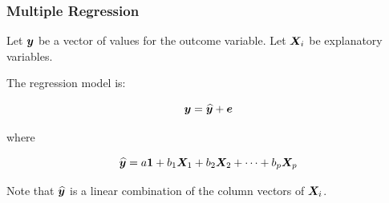 \documentclass{beamer}
\begin{document}
\begin{frame}
  \frametitle{Multiple Regression}

Let $\bm{y}$ be a vector of values for the outcome variable. Let $\bm{X}_i$ be explanatory variables.

\bigskip

The regression model is:

$$
\bm{y} = \widehat{\bm{y}} + \bm{e}
$$

where

$$
\widehat{\bm{y}} = a\bm{1} + b_1\bm{X}_1 + b_2\bm{X}_2 + \cdots + b_p\bm{X}_p
$$

\bigskip

Note that $\widehat{\bm{y}}$ is a linear combination of the column vectors of $\bm{X}_i$.



\end{frame}
\end{document}

